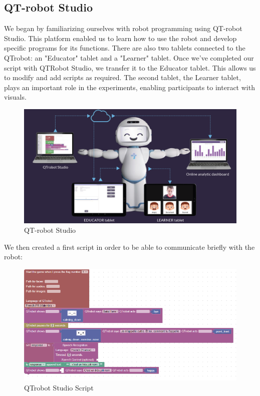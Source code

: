 \subsection{QT-robot Studio}
We began by familiarizing ourselves with robot programming using QT-robot Studio. This platform enabled us to learn how to use the robot and develop specific programs for its functions. There are also two tablets connected to the QTrobot: an "Educator" tablet and a "Learner" tablet. Once we've completed our script with QTRobot Studio, we transfer it to the Educator tablet. This allows us to modify and add scripts as required. The second tablet, the Learner tablet, plays an important role in the experiments, enabling participants to interact with visuals.\\

 \begin{figure}[!h]
\centering
 \includegraphics[width=14.25cm]{Figures/qtstudio.png}
 \caption{QT-robot Studio }
\end{figure}
\newpage
We then created a first script in order to be able to communicate briefly with the robot:
 \begin{figure}[!h]
\centering
 \includegraphics[width=14.25cm]{Figures/qtrobotscript1.png}
 \caption{QTrobot Studio Script}
\end{figure}

